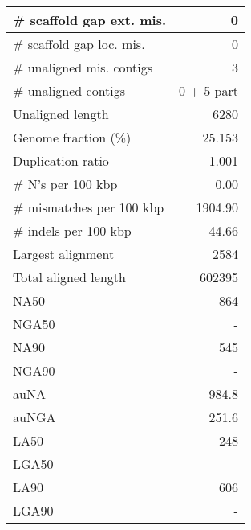 \documentclass[12pt,a4paper]{article}
\begin{document}
\begin{table}[ht]
\begin{center}
\begin{tabular}{|l*{1}{|r}|}
\# scaffold gap ext. mis. & 0 \\ \hline
\# scaffold gap loc. mis. & 0 \\ \hline
\# unaligned mis. contigs & 3 \\ \hline
\# unaligned contigs & 0 + 5 part \\ \hline
Unaligned length & 6280 \\ \hline
Genome fraction (\%) & 25.153 \\ \hline
Duplication ratio & 1.001 \\ \hline
\# N's per 100 kbp & 0.00 \\ \hline
\# mismatches per 100 kbp & 1904.90 \\ \hline
\# indels per 100 kbp & 44.66 \\ \hline
Largest alignment & 2584 \\ \hline
Total aligned length & 602395 \\ \hline
NA50 & 864 \\ \hline
NGA50 & - \\ \hline
NA90 & 545 \\ \hline
NGA90 & - \\ \hline
auNA & 984.8 \\ \hline
auNGA & 251.6 \\ \hline
LA50 & 248 \\ \hline
LGA50 & - \\ \hline
LA90 & 606 \\ \hline
LGA90 & - \\ \hline
\end{tabular}
\end{center}
\end{table}
\end{document}
